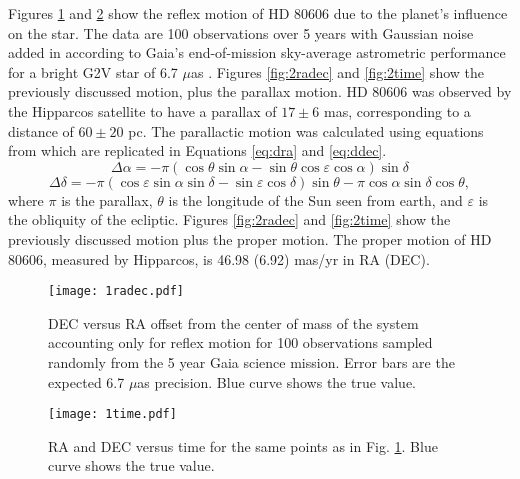 \documentclass[preprint]{aastex}
\begin{document}
Figures \ref{fig:1radec} and \ref{fig:1time} show the reflex motion of HD 80606 due to the planet's influence on the star. The data are 100 observations over 5 years with Gaussian noise added in according to Gaia's end-of-mission sky-average astrometric performance for a bright G2V star of 6.7 $\mu$as \citep{gaia}. 
Figures \ref{fig:2radec} and \ref{fig:2time} show the previously discussed motion, plus the parallax motion. HD 80606 was observed by the Hipparcos satellite to have a parallax of $17\pm6$ mas, corresponding to a distance of $60\pm20$ pc. The parallactic motion was calculated using equations from \citet{parallax} which are replicated in Equations \ref{eq:dra} and \ref{eq:ddec}. 
\begin{equation}
    \Delta\alpha=-\pi(\cos\theta\sin\alpha-\sin\theta\cos\varepsilon\cos\alpha)\sin\delta
    \label{eq:dra}
\end{equation}
\begin{equation}
    \Delta\delta=-\pi(\cos\varepsilon\sin\alpha\sin\delta-\sin\varepsilon\cos\delta)\sin\theta-\pi\cos\alpha\sin\delta\cos\theta,
    \label{eq:ddec}
\end{equation}
where $\pi$ is the parallax, $\theta$ is the longitude of the Sun seen from earth, and $\varepsilon$ is the obliquity of the ecliptic.
Figures \ref{fig:2radec} and \ref{fig:2time} show the previously discussed motion plus the proper motion. The proper motion of HD 80606, measured by Hipparcos, is 46.98 (6.92) mas/yr in RA (DEC).

\begin{figure}
\begin{center}
    \texttt{[image: 1radec.pdf]}
    \caption{DEC versus RA offset from the center of mass of the system accounting only for reflex motion for 100 observations sampled randomly from the 5 year Gaia science mission. Error bars are the expected 6.7 $\mu$as precision. Blue curve shows the true value.}
    \label{fig:1radec}
\end{center}
\end{figure}

\begin{figure}
\begin{center}
    \texttt{[image: 1time.pdf]}
    \caption{RA and DEC versus time for the same points as in Fig. \ref{fig:1radec}. Blue curve shows the true value.}
    \label{fig:1time}
\end{center}
\end{figure}
\end{document}

